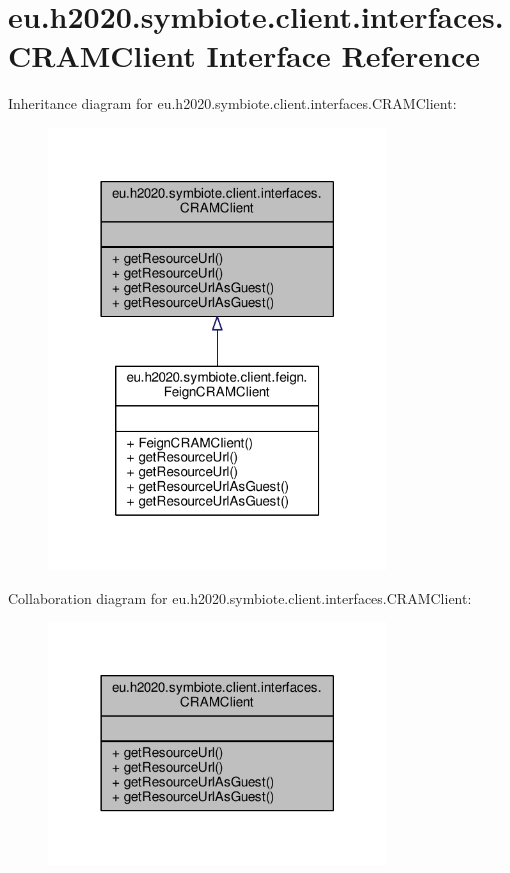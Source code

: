 \hypertarget{interfaceeu_1_1h2020_1_1symbiote_1_1client_1_1interfaces_1_1CRAMClient}{}\section{eu.\+h2020.\+symbiote.\+client.\+interfaces.\+C\+R\+A\+M\+Client Interface Reference}
\label{interfaceeu_1_1h2020_1_1symbiote_1_1client_1_1interfaces_1_1CRAMClient}


Inheritance diagram for eu.\+h2020.\+symbiote.\+client.\+interfaces.\+C\+R\+A\+M\+Client\+:
\nopagebreak
\begin{figure}[H]
\begin{center}
\leavevmode
\includegraphics[width=254pt]{interfaceeu_1_1h2020_1_1symbiote_1_1client_1_1interfaces_1_1CRAMClient__inherit__graph}
\end{center}
\end{figure}


Collaboration diagram for eu.\+h2020.\+symbiote.\+client.\+interfaces.\+C\+R\+A\+M\+Client\+:
\nopagebreak
\begin{figure}[H]
\begin{center}
\leavevmode
\includegraphics[width=254pt]{interfaceeu_1_1h2020_1_1symbiote_1_1client_1_1interfaces_1_1CRAMClient__coll__graph}
\end{center}
\end{figure}
